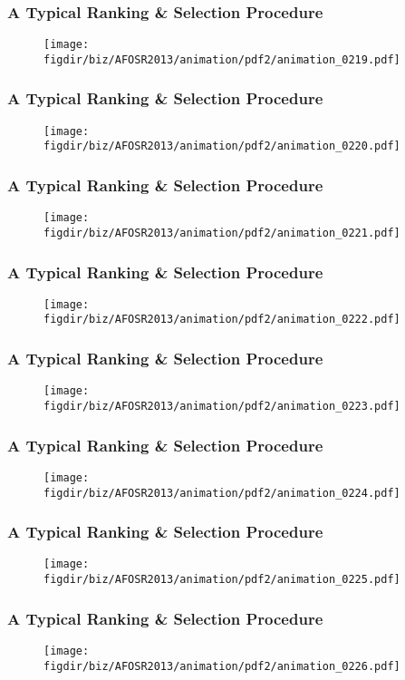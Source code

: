 \documentclass[13pt]{beamer}
\newcommand{\figdir}{../../fig}
\begin{document}
{\begin{frame}\frametitle{A Typical Ranking \& Selection Procedure}\begin{figure}\texttt{[image: \\figdir/biz/AFOSR2013/animation/pdf2/animation\_0219.pdf]}\end{figure}\end{frame}
\begin{frame}\frametitle{A Typical Ranking \& Selection Procedure}\begin{figure}\texttt{[image: \\figdir/biz/AFOSR2013/animation/pdf2/animation\_0220.pdf]}\end{figure}\end{frame}
\begin{frame}\frametitle{A Typical Ranking \& Selection Procedure}\begin{figure}\texttt{[image: \\figdir/biz/AFOSR2013/animation/pdf2/animation\_0221.pdf]}\end{figure}\end{frame}
\begin{frame}\frametitle{A Typical Ranking \& Selection Procedure}\begin{figure}\texttt{[image: \\figdir/biz/AFOSR2013/animation/pdf2/animation\_0222.pdf]}\end{figure}\end{frame}
\begin{frame}\frametitle{A Typical Ranking \& Selection Procedure}\begin{figure}\texttt{[image: \\figdir/biz/AFOSR2013/animation/pdf2/animation\_0223.pdf]}\end{figure}\end{frame}
\begin{frame}\frametitle{A Typical Ranking \& Selection Procedure}\begin{figure}\texttt{[image: \\figdir/biz/AFOSR2013/animation/pdf2/animation\_0224.pdf]}\end{figure}\end{frame}
\begin{frame}\frametitle{A Typical Ranking \& Selection Procedure}\begin{figure}\texttt{[image: \\figdir/biz/AFOSR2013/animation/pdf2/animation\_0225.pdf]}\end{figure}\end{frame}
\begin{frame}\frametitle{A Typical Ranking \& Selection Procedure}\begin{figure}\texttt{[image: \\figdir/biz/AFOSR2013/animation/pdf2/animation\_0226.pdf]}\end{figure}\end{frame}
}
\end{document}
